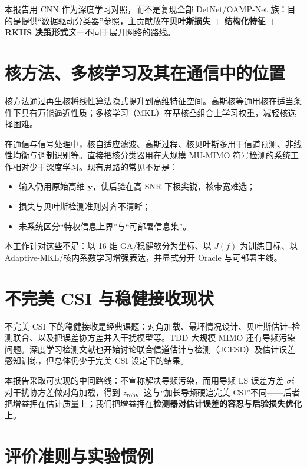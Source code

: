 本报告用 CNN 作为深度学习对照，而不是复现全部 DetNet/OAMP-Net 族：目的是提供“数据驱动分类器”参照，主贡献放在\textbf{贝叶斯损失 + 结构化特征 + RKHS 决策形式}这一不同于展开网络的路线。

\section{核方法、多核学习及其在通信中的位置}

核方法通过再生核将线性算法隐式提升到高维特征空间\cite{schafer2006,shawe2004,vapnik1998}。高斯核等通用核在适当条件下具有万能逼近性质\cite{steinwart2008}；多核学习（MKL）在基核凸组合上学习权重，减轻核选择困难\cite{bach2004,micchelli2005,cortes2009,rakotomamonjy2008}。

在通信与信号处理中，核自适应滤波、高斯过程、核贝叶斯多用于信道预测、非线性均衡与调制识别等。直接把核分类器用在大规模 MU-MIMO 符号检测的系统工作相对少于深度学习。现有思路的常见不足是：
\begin{itemize}
  \item 输入仍用原始高维 $\mathbf{y}$，使后验在高 SNR 下极尖锐，核带宽难选；
  \item 损失与贝叶斯检测准则对齐不清晰；
  \item 未系统区分“特权信息上界”与“可部署信息集”。
\end{itemize}
本工作针对这些不足：以 16 维 GA/稳健软分为坐标、以 $J(f)$ 为训练目标、以 Adaptive-MKL/核内系数学习增强表达，并显式分开 Oracle 与可部署主线。

\section{不完美 CSI 与稳健接收现状}

不完美 CSI 下的稳健接收是经典课题\cite{kay1993,bjornson2017}：对角加载、最坏情况设计、贝叶斯估计--检测联合、以及把误差协方差并入干扰模型等。TDD 大规模 MIMO 还有导频污染问题\cite{marzetta2010}。深度学习检测文献也开始讨论联合信道估计与检测（JCESD）及估计误差感知训练\cite{he2018}，但总体仍少于完美 CSI 设定下的结果。

本报告采取可实现的中间路线：不宣称解决导频污染，而用导频 LS 误差方差 $\sigma_e^2$ 对干扰协方差做对角加载，得到 $z_{\mathrm{rob}}$。这与“加长导频硬追完美 CSI”不同——后者把增益押在估计质量上；我们把增益押在\textbf{检测器对估计误差的容忍与后验损失优化}上。

\section{评价准则与实验惯例}

